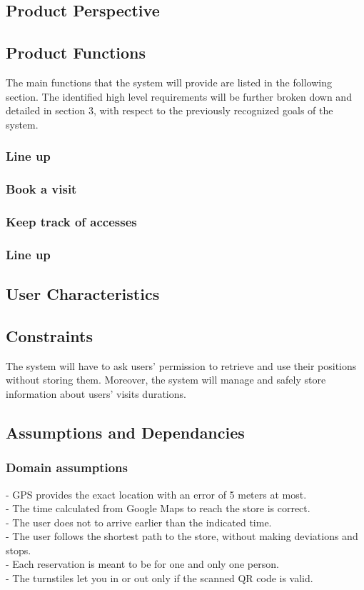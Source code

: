\documentclass{article}
\begin{document}
\subsection{Product Perspective}
\subsection{Product Functions}
The main functions that the system will provide are listed in the following section. The identified high level requirements will be further broken down and detailed in section 3, with respect to the previously recognized goals of the system.
\subsubsection{Line up} 
\subsubsection{Book a visit} 
\subsubsection{Keep track of accesses} 
\subsubsection{Line up} 
\subsection{User Characteristics}
\subsection{Constraints}
The system will have to ask users' permission to retrieve and use their positions without storing them. Moreover, the system will manage and safely store information about users' visits durations.
\subsection{Assumptions and Dependancies}
\subsubsection{Domain assumptions}
\noindent\medskip
[D1] - GPS provides the exact location with an error of 5 meters at most.\\
\noindent\medskip
[D2] - The time calculated from Google Maps to reach the store is correct.\\
\noindent\medskip
[D3] - The user does not to arrive earlier than the indicated time.\\
\noindent\medskip
[D4] - The user follows the shortest path to the store, without making deviations and stops.\\
\noindent\medskip
[D5] - Each reservation is meant to be for one and only one person.\\
\noindent\medskip
[D6] - The turnstiles let you in or out only if the scanned QR code is valid.\\
\end{document}
